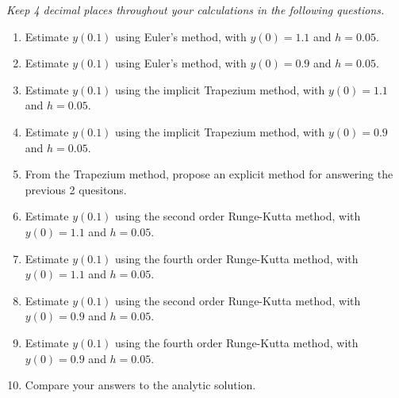 {\textit{Keep 4 decimal places throughout your calculations in the following questions.}
\begin{enumerate}[label=\alph*)]
	\item Estimate $y(0.1)$ using Euler's method, with $y(0)=1.1$ and $h=0.05$.
	
	\item Estimate $y(0.1)$ using Euler's method, with $y(0)=0.9$ and $h=0.05$.
	
	\item Estimate $y(0.1)$ using the implicit Trapezium method, with $y(0)=1.1$ and $h=0.05$.
	
	\item Estimate $y(0.1)$ using the implicit Trapezium method, with $y(0)=0.9$ and $h=0.05$.
	
	\item From the Trapezium method, propose an explicit method for answering the previous 2 quesitons.
	
	\item Estimate $y(0.1)$ using the second order Runge-Kutta method, with $y(0)=1.1$ and $h=0.05$.
	
	\item Estimate $y(0.1)$ using the fourth order Runge-Kutta method, with $y(0)=1.1$ and $h=0.05$.
	
	\item Estimate $y(0.1)$ using the second order Runge-Kutta method, with $y(0)=0.9$ and $h=0.05$.
	
	\item Estimate $y(0.1)$ using the fourth order Runge-Kutta method, with $y(0)=0.9$ and $h=0.05$.
	
	\item Compare your answers to the analytic solution.
\end{enumerate}
}